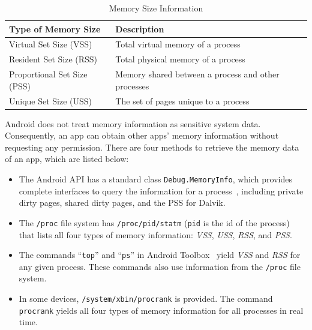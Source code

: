 \documentclass[letterpaper,12pt]{article}
\begin{document}
\begin{table}[h]
\centering
    \caption{Memory Size Information}
\begin{tabular}{|l|p{4.5cm}|}
    \hline\hline 
    \textbf{Type of Memory Size} & \textbf{Description} \\ 
    \hline\hline 
    \small Virtual Set Size (VSS) & \small Total virtual memory of a process \\ 
    \hline 
    \small Resident Set Size (RSS) & \small Total physical memory of a process \\ 
    \hline 
    \small Proportional Set Size (PSS) & \small Memory shared between a process and other processes \\ 
    \hline 
    \small Unique Set Size (USS) & \small  The set of pages unique to a process\\ 
    \hline 

\end{tabular} 
        \label{tab:memory}
\end{table}

Android does not treat memory information as sensitive
system data. Consequently, an app can obtain other apps' memory
information without requesting any permission. There are four methods to retrieve
the memory data of an app, which are listed below:
%
\begin{itemize}
\item The Android API has a standard class \texttt{Debug.MemoryInfo},
  which provides complete interfaces to query the information for
  a process~\cite{apimem}, including private dirty pages, shared dirty
  pages, and the PSS for Dalvik.
\item The \texttt{/proc} file system has \texttt{/proc/pid/statm}
  (\texttt{pid} is the id of the process) that lists all four types of
  memory information: \emph{VSS}, \emph{USS}, \emph{RSS}, and \emph{PSS}.
\item The commands ``\texttt{top}'' and ``\texttt{ps}'' in Android
  Toolbox~\cite{toolbox} yield \emph{VSS} and \emph{RSS} for any given
  process. These commands also use information from the \texttt{/proc}
  file system.
\item In some devices, \texttt{/system/xbin/procrank} is provided.
  The command \texttt{procrank} yields all four types of memory
  information for all processes in real time.
\end{itemize}
\end{document}
